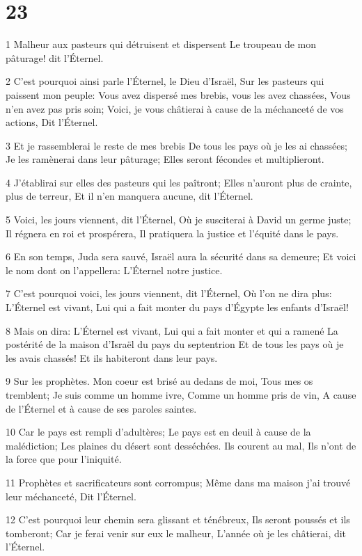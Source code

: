 \chapter{23}

\par 1 Malheur aux pasteurs qui détruisent et dispersent Le troupeau de mon pâturage! dit l'Éternel.
\par 2 C'est pourquoi ainsi parle l'Éternel, le Dieu d'Israël, Sur les pasteurs qui paissent mon peuple: Vous avez dispersé mes brebis, vous les avez chassées, Vous n'en avez pas pris soin; Voici, je vous châtierai à cause de la méchanceté de vos actions, Dit l'Éternel.
\par 3 Et je rassemblerai le reste de mes brebis De tous les pays où je les ai chassées; Je les ramènerai dans leur pâturage; Elles seront fécondes et multiplieront.
\par 4 J'établirai sur elles des pasteurs qui les paîtront; Elles n'auront plus de crainte, plus de terreur, Et il n'en manquera aucune, dit l'Éternel.
\par 5 Voici, les jours viennent, dit l'Éternel, Où je susciterai à David un germe juste; Il régnera en roi et prospérera, Il pratiquera la justice et l'équité dans le pays.
\par 6 En son temps, Juda sera sauvé, Israël aura la sécurité dans sa demeure; Et voici le nom dont on l'appellera: L'Éternel notre justice.
\par 7 C'est pourquoi voici, les jours viennent, dit l'Éternel, Où l'on ne dira plus: L'Éternel est vivant, Lui qui a fait monter du pays d'Égypte les enfants d'Israël!
\par 8 Mais on dira: L'Éternel est vivant, Lui qui a fait monter et qui a ramené La postérité de la maison d'Israël du pays du septentrion Et de tous les pays où je les avais chassés! Et ils habiteront dans leur pays.
\par 9 Sur les prophètes. Mon coeur est brisé au dedans de moi, Tous mes os tremblent; Je suis comme un homme ivre, Comme un homme pris de vin, A cause de l'Éternel et à cause de ses paroles saintes.
\par 10 Car le pays est rempli d'adultères; Le pays est en deuil à cause de la malédiction; Les plaines du désert sont desséchées. Ils courent au mal, Ils n'ont de la force que pour l'iniquité.
\par 11 Prophètes et sacrificateurs sont corrompus; Même dans ma maison j'ai trouvé leur méchanceté, Dit l'Éternel.
\par 12 C'est pourquoi leur chemin sera glissant et ténébreux, Ils seront poussés et ils tomberont; Car je ferai venir sur eux le malheur, L'année où je les châtierai, dit l'Éternel.
